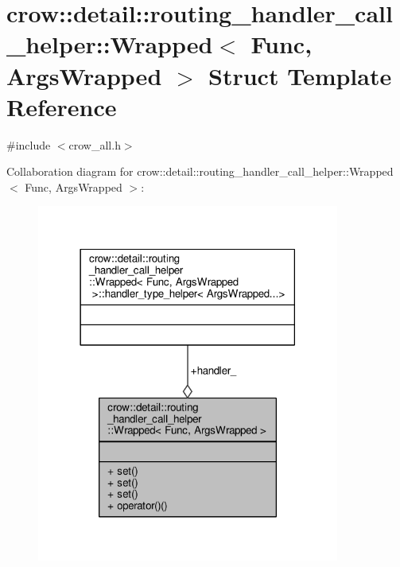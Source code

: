 \hypertarget{structcrow_1_1detail_1_1routing__handler__call__helper_1_1_wrapped}{\section{crow\-:\-:detail\-:\-:routing\-\_\-handler\-\_\-call\-\_\-helper\-:\-:Wrapped$<$ Func, Args\-Wrapped $>$ Struct Template Reference}
\label{structcrow_1_1detail_1_1routing__handler__call__helper_1_1_wrapped}
}


{\ttfamily \#include $<$crow\-\_\-all.\-h$>$}



Collaboration diagram for crow\-:\-:detail\-:\-:routing\-\_\-handler\-\_\-call\-\_\-helper\-:\-:Wrapped$<$ Func, Args\-Wrapped $>$\-:
\nopagebreak
\begin{figure}[H]
\begin{center}
\leavevmode
\includegraphics[width=282pt]{structcrow_1_1detail_1_1routing__handler__call__helper_1_1_wrapped__coll__graph}
\end{center}
\end{figure}
